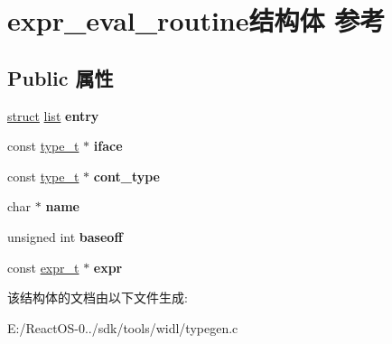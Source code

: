 \hypertarget{structexpr__eval__routine}{}\section{expr\+\_\+eval\+\_\+routine结构体 参考}
\label{structexpr__eval__routine}
\subsection*{Public 属性}
\begin{DoxyCompactItemize}
\item 
\mbox{\label{structexpr__eval__routine_ab7747bdb82d7410ed391d0cafb5c2c73}} 
\hyperlink{interfacestruct}{struct} \hyperlink{classlist}{list} {\bfseries entry}
\item 
\mbox{\label{structexpr__eval__routine_aeb43fd85391032f2ac5405529da6b880}} 
const \hyperlink{struct__type__t}{type\+\_\+t} $\ast$ {\bfseries iface}
\item 
\mbox{\label{structexpr__eval__routine_a7b66311146eaae6870572bb694b609dd}} 
const \hyperlink{struct__type__t}{type\+\_\+t} $\ast$ {\bfseries cont\+\_\+type}
\item 
\mbox{\label{structexpr__eval__routine_a05c17ee9494dbfe99ee0ecc99c818dcd}} 
char $\ast$ {\bfseries name}
\item 
\mbox{\label{structexpr__eval__routine_a79e60be6c13c9f7d52f9cafd5c0ef8d8}} 
unsigned int {\bfseries baseoff}
\item 
\mbox{\label{structexpr__eval__routine_aa3ce391cc2cafc3b28155d6622d3c6f4}} 
const \hyperlink{struct__expr__t}{expr\+\_\+t} $\ast$ {\bfseries expr}
\end{DoxyCompactItemize}


该结构体的文档由以下文件生成\+:\begin{DoxyCompactItemize}
\item 
E\+:/\+React\+O\+S-\/0../sdk/tools/widl/typegen.\+c\end{DoxyCompactItemize}
